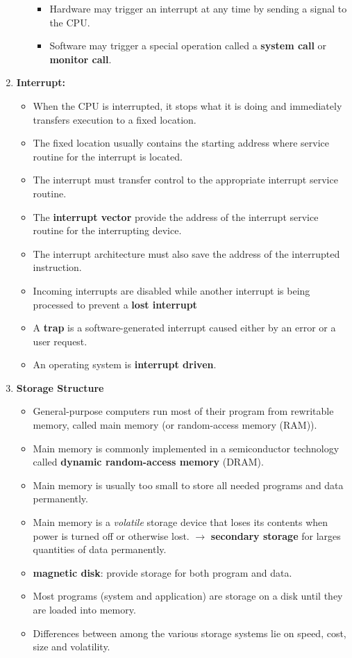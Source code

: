 \documentclass[10pt]{article}
\begin{document}
\begin{enumerate}
\begin{itemize}
		\begin{itemize}
			\item Hardware may trigger an interrupt at any time by sending a signal to the CPU.
			\item Software may trigger a special operation called a \textbf{system call} or \textbf{monitor call}.
		\end{itemize}

	\end{itemize}

	\item \textbf{Interrupt: }
	\begin{itemize}
		\item When the CPU is interrupted, it stops what it is doing and immediately transfers execution to a fixed location.
		\item The fixed location usually contains the starting address where service routine for the interrupt is located.
		\item The interrupt must transfer control to the appropriate interrupt service routine.
		\item The \textbf{interrupt vector} provide the address of the interrupt service routine for the interrupting device.
		\item The interrupt architecture must also save the address of the interrupted instruction.
		\item Incoming interrupts are disabled while another interrupt is being processed to prevent a \textbf{lost interrupt}
		\item A \textbf{trap} is a software-generated interrupt caused either by an error or a user request.
		\item An operating system is \textbf{interrupt driven}. 
	\end{itemize}

	\item \textbf{Storage Structure}
	\begin{itemize}
		\item General-purpose computers run most of their program from rewritable memory, called main memory (or random-access memory (RAM)).
		\item Main memory is commonly implemented in a semiconductor technology called \textbf{dynamic random-access memory} (DRAM).
		\item Main memory is usually too small to store all needed programs and data permanently.
		\item Main memory is a \textit{volatile} storage device that loses its contents when power is turned off or otherwise lost.
		$\rightarrow$ \textbf{secondary storage} for larges quantities of data permanently.
		\item \textbf{magnetic disk}: provide storage for both program and data.
		\item Most programs (system and application) are storage on a disk until they are loaded into memory.
		\item Differences between among the various storage systems lie on speed, cost, size and volatility.


\end{itemize}
\end{enumerate}
\end{document}
